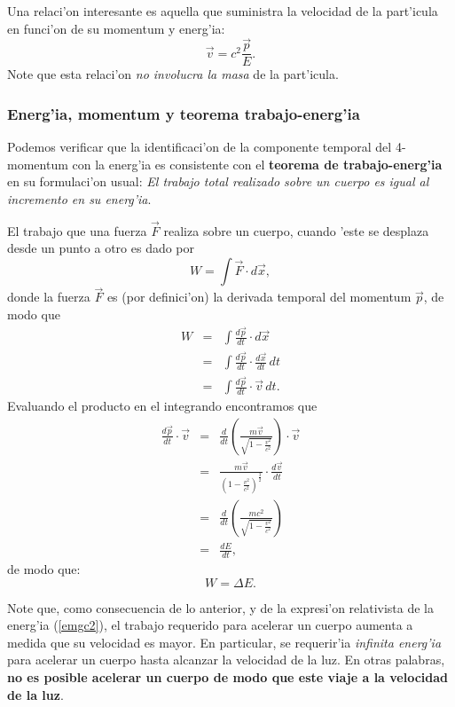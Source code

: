 Una relaci'on interesante es aquella que suministra la velocidad de la
part'icula en funci'on de su momentum y energ'ia:
\begin{equation}
\vec{v}=c^2\frac{\vec{p}}{E}. \label{vpe}
\end{equation}
Note que esta relaci'on \textit{no involucra la masa} de la part'icula.

\subsubsection{Energ'ia, momentum y teorema trabajo-energ'ia}
Podemos verificar que la identificaci'on de la componente temporal del 4-momentum con la energ'ia es consistente con el \textbf{teorema de trabajo-energ'ia} en su formulaci'on usual: \textit{El trabajo total realizado sobre un cuerpo es igual al incremento en su energ'ia}.

El trabajo que una fuerza $\vec{F}$ realiza sobre un cuerpo, cuando 'este se desplaza desde un punto a otro es dado por
\begin{equation}
W=\int\vec{F} \cdot d\vec{x},
\end{equation}
donde la fuerza $\vec{F}$ es (por definici'on) la derivada temporal del momentum $\vec{p}$, de modo
que
\begin{eqnarray}
W&=&\int\frac{d\vec{p}}{dt} \cdot d\vec{x}\\
&=&\int\frac{d\vec{p}}{dt} \cdot \frac{d\vec{x}}{dt}\,dt\\
&=&\int\frac{d\vec{p}}{dt} \cdot \vec{v}\,dt.
\end{eqnarray}
Evaluando el producto en el integrando encontramos que
\begin{eqnarray}
\frac{d\vec{p}}{dt} \cdot
\vec{v}&=&\frac{d}{dt}(\frac{m\vec{v}}{\sqrt{1-\frac{v^2}{c^2}}})\cdot
\vec{v}\\
&=&\frac{m\vec{v}}{(1-\frac{v^2}{c^2})^{\frac{3}{2}}}\cdot
\frac{d\vec{v}}{dt}\\
&=&\frac{d}{dt}(\frac{mc^2}{\sqrt{1-\frac{v^2}{c^2}}}) \\
&=&\frac{dE}{dt},
\end{eqnarray}
de modo que:
\begin{equation}
\boxed{W=\Delta E.}
\end{equation}

Note que, como consecuencia de lo anterior, y de la expresi'on relativista de la energ'ia (\ref{emgc2}), el trabajo requerido para acelerar un cuerpo aumenta a medida que su velocidad es mayor. En particular, se requerir'ia \textit{infinita energ'ia} para acelerar un cuerpo hasta alcanzar la velocidad de la luz. En otras palabras, \textbf{no es posible acelerar un cuerpo de modo que este viaje a la velocidad de la luz}.

